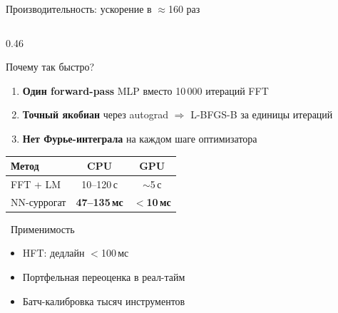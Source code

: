\documentclass[aspectratio=169, 10pt]{beamer}
\begin{document}
\begin{frame}{Производительность: ускорение в $\approx$160 раз}
\begin{columns}[T]
    \begin{column}{0.46\textwidth}
      \begin{block}{Почему так быстро?}
        \scriptsize
        \begin{enumerate}
          \item \textbf{Один forward-pass} MLP вместо
                10\,000 итераций FFT
          \item \textbf{Точный якобиан} через autograd
                $\Rightarrow$ L-BFGS-B за единицы итераций
          \item \textbf{Нет Фурье-интеграла}
                на каждом шаге оптимизатора
        \end{enumerate}
      \end{block}

      \vspace{0.2em}
      \begin{center}\small
      \begin{tabular}{@{}lcc@{}}
        \toprule
        Метод       & CPU & GPU \\ \midrule
        FFT + LM    & 10--120\,с & $\sim$5\,с \\
        NN-суррогат & \textbf{47--135\,мс} & \textbf{$<$10\,мс} \\
        \bottomrule
      \end{tabular}
      \end{center}

      \vspace{0.2em}
      \begin{exampleblock}{\faRocket\ Применимость}
        \scriptsize
        \begin{itemize}
          \item HFT: дедлайн $<$100\,мс \checkmark
          \item Портфельная переоценка в реал-тайм \checkmark
          \item Батч-калибровка тысяч инструментов \checkmark
        \end{itemize}
      \end{exampleblock}
    \end{column}

  \end{columns}
\end{frame}
\end{document}

